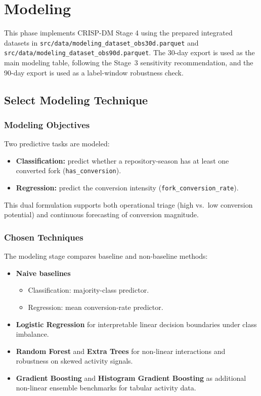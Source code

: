 \section{Modeling}

This phase implements CRISP-DM Stage 4 using the prepared integrated datasets in \texttt{src/data/modeling\_dataset\_obs30d.parquet} and \texttt{src/data/modeling\_dataset\_obs90d.parquet}. The 30-day export is used as the main modeling table, following the Stage~3 sensitivity recommendation, and the 90-day export is used as a label-window robustness check.

\subsection{Select Modeling Technique}

\subsubsection{Modeling Objectives}

Two predictive tasks are modeled:
\begin{itemize}
    \item \textbf{Classification:} predict whether a repository-season has at least one converted fork (\texttt{has\_conversion}).
    \item \textbf{Regression:} predict the conversion intensity (\texttt{fork\_conversion\_rate}).
\end{itemize}

This dual formulation supports both operational triage (high vs.\ low conversion potential) and continuous forecasting of conversion magnitude.

\subsubsection{Chosen Techniques}

The modeling stage compares baseline and non-baseline methods:
\begin{itemize}
    \item \textbf{Naive baselines}
    \begin{itemize}
        \item Classification: majority-class predictor.
        \item Regression: mean conversion-rate predictor.
    \end{itemize}
    \item \textbf{Logistic Regression} for interpretable linear decision boundaries under class imbalance.
    \item \textbf{Random Forest} and \textbf{Extra Trees} for non-linear interactions and robustness on skewed activity signals.
    \item \textbf{Gradient Boosting} and \textbf{Histogram Gradient Boosting} as additional non-linear ensemble benchmarks for tabular activity data.
\end{itemize}

